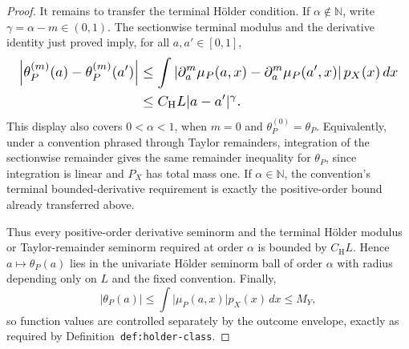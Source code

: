 \documentclass{article}
\begin{document}
\begin{proof}
It remains to transfer the terminal Hölder condition. If \(\alpha\notin\mathbb N\), write \(\gamma=\alpha-m\in(0,1)\). The sectionwise terminal modulus and the derivative identity just proved imply, for all \(a,a'\in[0,1]\),
\[
\makebox[\linewidth][c]{\resizebox{0.98\linewidth}{!}{\(\displaystyle \begin{aligned}
\left\lvert\theta_P^{(m)}(a)-\theta_P^{(m)}(a')\right\rvert
&\le \int\left\lvert\partial_a^m\mu_P(a,x)-\partial_a^m\mu_P(a',x)\right\rvert p_X(x)\,dx\\
&\le C_{\mathrm H}L\lvert a-a'\rvert^{\gamma}.
\end{aligned}\)}}
\]
This display also covers \(0<\alpha<1\), when \(m=0\) and \(\theta_P^{(0)}=\theta_P\). Equivalently, under a convention phrased through Taylor remainders, integration of the sectionwise remainder gives the same remainder inequality for \(\theta_P\), since integration is linear and \(P_X\) has total mass one. If \(\alpha\in\mathbb N\), the convention's terminal bounded-derivative requirement is exactly the positive-order bound already transferred above.

Thus every positive-order derivative seminorm and the terminal Hölder modulus or Taylor-remainder seminorm required at order \(\alpha\) is bounded by \(C_{\mathrm H}L\). Hence \(a\mapsto\theta_P(a)\) lies in the univariate Hölder seminorm ball of order \(\alpha\) with radius depending only on \(L\) and the fixed convention. Finally,
\[
\lvert\theta_P(a)\rvert
\le\int\lvert\mu_P(a,x)\rvert p_X(x)\,dx
\le M_Y,
\]
so function values are controlled separately by the outcome envelope, exactly as required by Definition~\texttt{def:holder-class}.
\end{proof}
\end{document}
